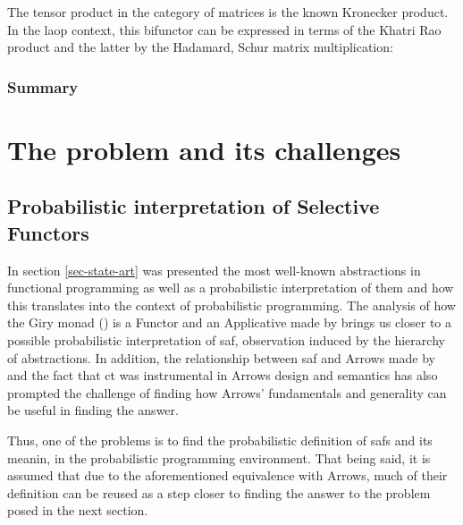 \documentclass[
  oneside,
  11pt, a4paper,
  footinclude=true,
  headinclude=true,
  cleardoublepage=empty
]{scrbook}
\theoremstyle{definition}
\theoremstyle{definition}
\begin{document}
        The tensor product in the category of matrices is the known Kronecker product. In the \gls{laop} context, this bifunctor can be expressed in terms of the Khatri Rao product and the latter by the Hadamard, Schur matrix multiplication:
    
        \begin{center}
        \end{center}{}
        
    \subsection{Summary}
    
	\chapter{The problem and its challenges}\label{ch-problem}
	
	\section{Probabilistic interpretation of Selective Functors}
	
	In section \ref{sec-state-art} was presented the most well-known abstractions in functional programming as well as a probabilistic interpretation of them and how this translates into the context of probabilistic programming. The analysis of how the Giry monad (\cite{giry1982}) is a Functor and an Applicative made by \cite{jtobin} brings us closer to a possible probabilistic interpretation of \gls{saf}, observation induced by the hierarchy of abstractions. In addition, the relationship between \gls{saf} and Arrows made by \cite{andrey2019selective} and the fact that \gls{ct} was instrumental in Arrows design and semantics has also prompted the challenge of finding how Arrows' fundamentals and generality can be useful in finding the answer.
	
	Thus, one of the problems is to find the probabilistic definition of \glspl{saf} and its meanin, in the probabilistic programming environment. That being said, it is assumed that due to the aforementioned equivalence with Arrows, much of their definition can be reused as a step closer to finding the answer to the problem posed in the next section.
\end{document}
